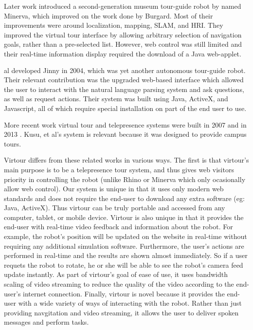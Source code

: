 \documentclass[
  oneside,
  11pt, a4paper,
  footinclude=true,
  headinclude=true,
  cleardoublepage=empty
]{article}
\begin{document}
Later work introduced a second-generation museum tour-guide robot by
\cite{thrun1999} named Minerva, which improved on the work done by Burgard.
Most of their improvements were around localization, mapping, SLAM, and HRI.
They improved the virtual tour interface by allowing arbitrary selection of
navigation goals, rather than a pre-selected list. However, web control was
still limited and their real-time information display required the download of
a Java web-applet.

\cite{km2004} al developed Jinny in 2004, which was yet another autonomous
tour-guide robot. Their relevant contribution was the upgraded web-based
interface which allowed the user to interact with the natural language parsing
system and ask questions, as well as request actions. Their system was built
using Java, ActiveX, and Javascript, all of which require special installation
on part of the end user to use.

More recent work virtual tour and telepresence systems were built in 2007
\cite{michaud2007} and in 2013 \cite{kusu2013}. Kusu, et al's system is relevant
because it was designed to provide campus tours.

Virtour differs from these related works in various ways. The first is that
virtour's main purpose is to be a telepresence tour system, and thus gives web
visitors priority in controlling the robot (unlike Rhino or Minerva which only
ocasionally allow web control). Our system is unique in that it uses
only modern web standards and does not require the end-user to download any
extra software (eg: Java, ActiveX). Thus virtour can be truly portable and
accessed from any computer, tablet, or mobile device. Virtour is also
unique in that it provides the end-user with real-time video feedback and
information about the robot. For example, the robot's position will be updated
on the website in real-time without requiring any additional simulation
software. Furthermore, the user's actions are performed in real-time and the
results are shown almost immediately. So if a user requets the robot to rotate,
he or she will be able to see the robot's camera feed update instantly.  As
part of virtour's goal of ease of use, it uses bandwidth scaling of video
streaming to reduce the quality of the video according to the end-user's
internet connection. Finally, virtour is novel because it provides the end-user
with a wide variety of ways of interacting with the robot. Rather than just
providing navgitation and video streaming, it allows the user to deliver spoken
messages and perform tasks.
\end{document}
